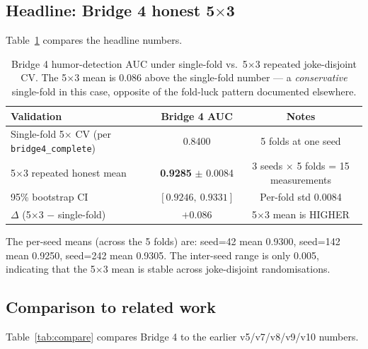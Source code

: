 \documentclass[11pt, letterpaper]{article}
\begin{document}
\subsection{Headline: Bridge 4 honest 5$\times$3}

Table~\ref{tab:main} compares the headline numbers.

\begin{table}[h]
\centering
\begin{tabular}{lcc}
\toprule
\textbf{Validation} & \textbf{Bridge 4 AUC} & \textbf{Notes} \\
\midrule
Single-fold 5$\times$ CV (per \texttt{bridge4\_complete}) & 0.8400 & 5 folds at one seed \\
\midrule
5$\times$3 repeated honest mean & \textbf{0.9285} $\pm$ 0.0084 & 3 seeds $\times$ 5 folds = 15 measurements \\
95\% bootstrap CI & $[0.9246,\ 0.9331]$ & Per-fold std 0.0084 \\
\midrule
$\Delta$ (5$\times$3 $-$ single-fold) & $+0.086$ & 5$\times$3 mean is HIGHER \\
\bottomrule
\end{tabular}
\caption{Bridge 4 humor-detection AUC under single-fold vs.\ 5$\times$3 repeated joke-disjoint CV. The 5$\times$3 mean is $0.086$ above the single-fold number --- a \emph{conservative} single-fold in this case, opposite of the fold-luck pattern documented elsewhere.}
\label{tab:main}
\end{table}

The per-seed means (across the 5 folds) are: seed=42 mean 0.9300, seed=142 mean 0.9250, seed=242 mean 0.9305. The inter-seed range is only 0.005, indicating that the 5$\times$3 mean is stable across joke-disjoint randomisations.

\subsection{Comparison to related work}

Table~\ref{tab:compare} compares Bridge 4 to the earlier v5/v7/v8/v9/v10 numbers.
\end{document}
